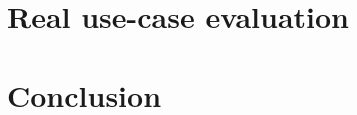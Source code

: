 \documentclass[5p]{elsarticle}
\begin{document}
\section{Real use-case evaluation}
\label{sec:use-cases}


\section{Conclusion}
\label{sec:conc}






%  

\end{document}

